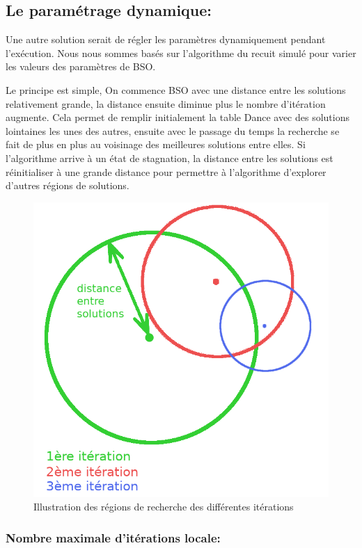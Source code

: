 	\subsection{Le paramétrage dynamique:}
	Une autre solution serait de régler les paramètres dynamiquement pendant l’exécution. Nous nous sommes basés sur l’algorithme du recuit simulé \cite{simulatedAnnealing} pour varier les valeurs des paramètres de BSO.

	Le principe est simple, On commence BSO avec une distance entre les solutions relativement grande, la distance ensuite diminue plus le nombre d’itération augmente. Cela permet de remplir initialement la table Dance avec des solutions lointaines les unes des autres, ensuite avec le passage du temps la recherche se fait de plus en plus au voisinage des meilleures solutions entre elles. Si l’algorithme arrive à un état de stagnation, la distance entre les solutions est réinitialiser à une grande distance pour permettre à l’algorithme d’explorer d’autres régions de solutions.
	\begin{figure}[H]\label{Regions}
		\centering
		\includegraphics[scale=0.35]{images/imgs/regions.png}
		\caption{Illustration des régions de recherche des différentes itérations}
	\end{figure}
	\subsubsection{Nombre maximale d’itérations locale:}
